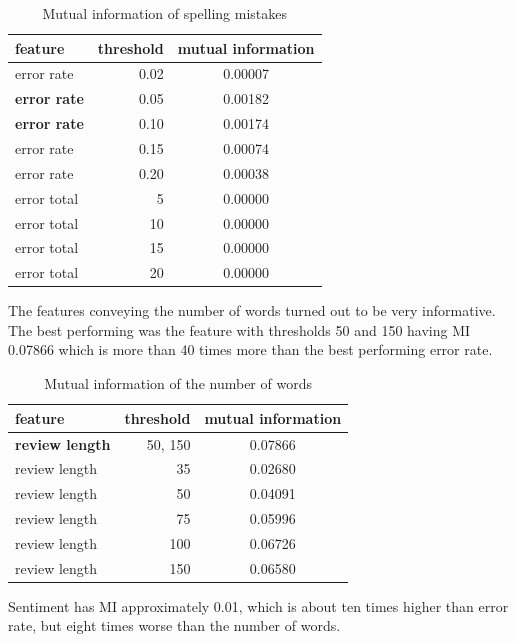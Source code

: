 \begin{table}[h!]

\centering
\begin{tabular}{lrS[table-format=3.2]}
\toprule
\textbf{feature} & \textbf{threshold} & \textbf{mutual information} \\
\midrule
error rate & 0.02 & 0.00007 \\
\textbf{error rate} & 0.05 & 0.00182 \\
\textbf{error rate} & 0.10 & 0.00174 \\
error rate & 0.15 & 0.00074 \\
error rate & 0.20 & 0.00038 \\
\midrule
error total & 5 & 0.00000 \\
error total & 10 & 0.00000 \\
error total & 15 & 0.00000 \\
error total & 20 & 0.00000 \\
\bottomrule
\end{tabular}

\caption{Mutual information of spelling mistakes}\label{tab:mi_errors}
\end{table}


The features conveying the number of words turned out to be very informative.
The best performing was the feature with thresholds 50 and 150 having MI 0.07866 which
is more than 40 times more than the best performing error rate.

\begin{table}[h!]

\centering
\begin{tabular}{lrS[table-format=3.2]}
\toprule
\textbf{feature} & \textbf{threshold} & \textbf{mutual information} \\
\midrule
\textbf{review length} & 50, 150 & 0.07866 \\
review length & 35 & 0.02680 \\
review length & 50 & 0.04091 \\
review length & 75 & 0.05996 \\
review length & 100 & 0.06726 \\
review length & 150 & 0.06580 \\

\bottomrule
\end{tabular}
\caption{Mutual information of the number of words}\label{tab:mi_words}
\end{table}

Sentiment has MI approximately 0.01, which is about ten times higher
than error rate, but eight times worse than the number of words.

